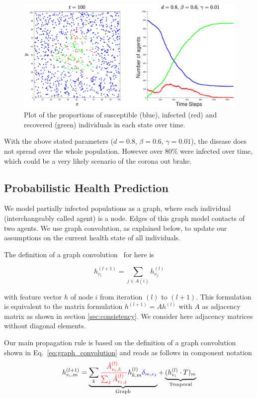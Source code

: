 \documentclass[]{article}
\begin{document}
\begin{figure}[H]
    \centering
    \includegraphics[width=0.9\linewidth]{1_1000_agents}
    \caption{Plot of the proportions of susceptible (blue), infected (red) and recovered (green) individuals in each state over time.}
    \label{fig:2}
\end{figure}

With the above stated parameters ($d=0.8$, $\beta=0.6$, $\gamma=0.01$), the disease does not spread over the whole population. However over 80\% were infected over time, which could be a very likely scenario of the corona out brake.


\subsection{Probabilistic Health Prediction}

We model partially infected populations as a graph, where each individual (interchangeably called agent) is a node. Edges of this graph model contacts of two agents. We use graph convolution, as explained below, to update our assumptions on the current health state of all individuals.

The definition of a graph convolution~\cite{Kipf2017SemiSupervisedCW} for here is

\begin{equation}
	\label{eq:graph_convolution}
	h_{v_i}^{(l+1)} = \sum_{j\in A(i)} h_{v_j}^{(l)}
\end{equation}

with feature vector $h$ of node $i$ from iteration $(l)$ to $(l+1)$. This formulation is equivalent to the matrix formulation $h^{(l+1)} = A h^{(l)}$ with $A$ as adjacency matrix as shown in section \ref{sec:consistency}. We consider here adjacency matrices without diagonal elements.

Our main propagation rule is based on the definition of a graph convolution shown in Eq.~\eqref{eq:graph_convolution} and reads as follows in component notation
\begin{equation}
	h_{v_i, m}^{(l+1)}
	=
	\underbrace{
		\sum_k \textcolor{red}{\frac{\hat{A}_{v_i, k}^{(l)}}{\sum_j \hat{A}_{v_i, j}^{(l)}}} h_{k, m}^{(l)} \textcolor{blue}{\delta_{m, e_I}}
	}_{\text{Graph}}
	+
	\underbrace{
		(h_{v_i}^{(l)}\cdot T)_m
	}_{\text{Temporal}}
\end{equation}
\end{document}
